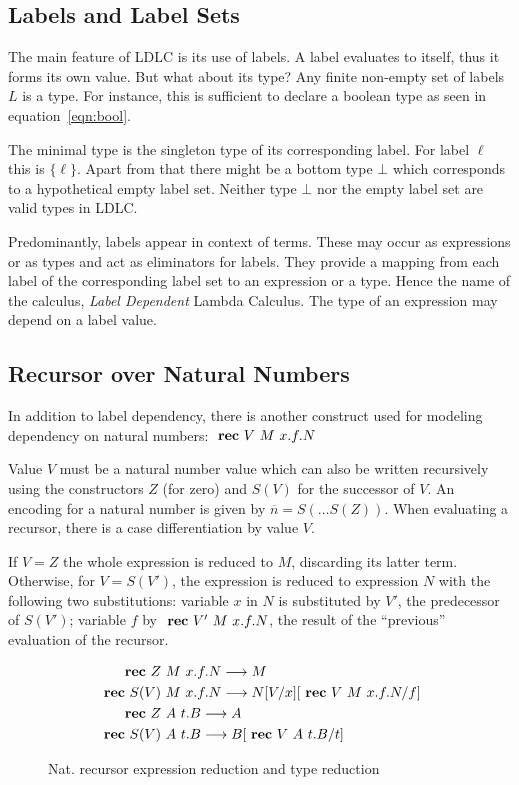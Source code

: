 \subsection{Labels and Label Sets}

The main feature of LDLC is its use of labels. A label evaluates to itself, thus it forms its own value. But what about its type? Any finite non-empty set of labels $L$ is a type. For instance, this is sufficient to declare a boolean type as seen in equation~\ref{eqn:bool}.

The minimal type is the singleton type of its corresponding label. For label $\ell$ this is $\{\ell\}$. Apart from that there might be a bottom type $\bot$ which corresponds to a hypothetical empty label set. Neither type $\bot$ nor the empty label set are valid types in LDLC.

Predominantly, labels appear in context of \case terms. These may occur as expressions or as types and act as eliminators for labels. They provide a mapping from each label of the corresponding label set to an expression or a type. Hence the name of the calculus, \emph{Label Dependent} Lambda Calculus. The type of an expression may depend on a label value.

\subsection{Recursor over Natural Numbers}

In addition to label dependency, there is another construct used for modeling dependency on natural numbers: $\text{ \textbf{rec} } V~M~x.f.N$

Value $V$ must be a natural number value which can also be written recursively using the constructors $Z$ (for zero) and $S(V)$ for the successor of $V$. An encoding for a natural number is given by $\overline{n} = S(\dots S(Z))$. When evaluating a recursor, there is a case differentiation by value $V$.

If $V=Z$ the whole expression is reduced to $M$, discarding its latter term. Otherwise, for $V=S(V')$, the \rec expression is reduced to expression $N$ with the following two substitutions: variable $x$ in $N$ is substituted by $V'$, the predecessor of $S(V')$; variable $f$ by $\text{ \textbf{rec} } V'~M~x.f.N$, the result of the ``previous'' evaluation of the recursor.

\begin{figure}
 \begin{align*}
 \text{ \textbf{rec} } Z~&M~x.f.N \longrightarrow M \\
 \text{ \textbf{rec} } S(V)~&M~x.f.N \longrightarrow N [V/x] [\text{ \textbf{rec} } V~M~x.f.N/f] \\
 \text{ \textbf{rec} } Z~&A~t.B \longrightarrow A \\
 \text{ \textbf{rec} } S(V)~&A~t.B \longrightarrow B [\text{ \textbf{rec} } V~A~t.B/t]
\end{align*}
\caption{Nat. recursor expression reduction and type reduction}
\label{fig:ldlc-rec-exp}
\end{figure}


